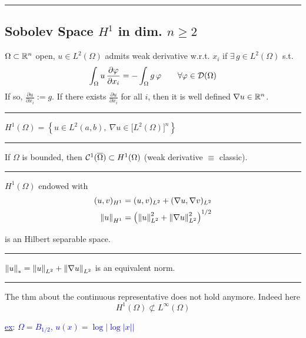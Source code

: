 \rule{0.31\textwidth}{0.2pt}


\subsection{\color{red}Sobolev Space \texorpdfstring{$H^1$}{C} in dim. \texorpdfstring{$n\geq 2$}{C}}


$\Omega\subset \mathbb{R}^n$ open, $u\in L^2(\Omega)$ admits weak derivative w.r.t. $x_i$ if $\exists\,g\in L^2(\Omega)$ s.t.
\begin{equation*}
\int_\Omega u\,\frac{\partial\varphi}{\partial x_i}=-\int_\Omega g\,\varphi\qquad\forall \varphi\in \mathcal{D}(\Omega)
\end{equation*}
If so, $\frac{\partial u}{\partial x_i} :=g$. If there exists $\frac{\partial u}{\partial x_i}$ for all $i$, then it is well defined $\nabla u\in\mathbb{R}^n$. 

\rule{0.31\textwidth}{0.2pt}
\smallskip

$H^1(\Omega) = \left\{ u\in L^2(a,b),\ \nabla u\in\big[ L^2(\Omega) \big]^n \right\}$

\rule{0.31\textwidth}{0.2pt}
\smallskip

If $\Omega$ is bounded, then $\mathcal{C}^1(\overline{\Omega})\subset H^1(\Omega)$ (weak derivative $\equiv$ classic).

\rule{0.31\textwidth}{0.2pt}
\smallskip

$H^1(\Omega)$ endowed with
\begin{align*}
(u,v)_{H^1}&=(u,v)_{L^2}+(\nabla u,\nabla v)_{L^2} \\
\left\lVert u \right\rVert_{H^1}&=\left( \left\lVert u \right\rVert^2_{L^2}+\left\lVert \nabla u \right\rVert^2_{L^2} \right)^{1/2}
\end{align*}

is an Hilbert separable space.

\rule{0.31\textwidth}{0.2pt}
\smallskip

$\left\lVert u \right\rVert_{*}=\left\lVert u \right\rVert_{L^2}+\left\lVert \nabla u \right\rVert
_{L^2}$ is an equivalent norm.

\rule{0.31\textwidth}{0.2pt}
\smallskip

The thm about the continuous representative does not hold anymore. Indeed here
\begin{equation*}
H^1(\Omega)\not\subset L^\infty(\Omega)
\end{equation*}

\textcolor{blue}{\underline{ex}: $\Omega=B_{1/2}$, $u(x)=\log\left| \log \left| x \right| \right|$ }

